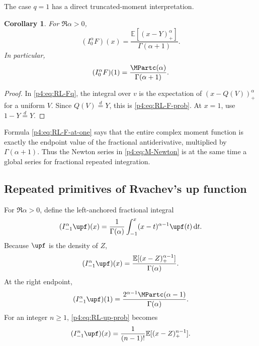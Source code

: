 \documentclass[11pt,oneside]{article}
\newtheorem{corollary}[theorem]{Corollary}
\theoremstyle{definition}
\theoremstyle{remark}
\newcommand{\F}{F}
\newcommand{\Q}{Q}
\newcommand{\E}{\mathbb E}
\newcommand{\dd}{\,\mathrm d}
\newcommand{\1}{\mathbf 1}
\begin{document}
The case \(q=1\) has a direct truncated-moment interpretation.

\begin{corollary}\label{p4:cor:RL-F-prob}
For \(\Re\alpha>0\),
\begin{equation}\label{p4:eq:RL-F-prob}
 (I_0^\alpha\F)(x)
 =\frac{\E[(x-Y)_+^\alpha]}{\Gamma(\alpha+1)}.
\end{equation}
In particular,
\begin{equation}\label{p4:eq:RL-F-at-one}
 (I_0^\alpha\F)(1)
 =\frac{\MPartc(\alpha)}{\Gamma(\alpha+1)}.
\end{equation}
\end{corollary}

\begin{proof}
In \cref{p4:eq:RL-Fq}, the integral over \(v\) is the expectation of
\((x-\Q(V))_+^\alpha\) for a uniform \(V\).  Since \(\Q(V)\overset d=Y\), this is
\cref{p4:eq:RL-F-prob}.  At \(x=1\), use \(1-Y\overset d=Y\).
\end{proof}

Formula \cref{p4:eq:RL-F-at-one} says that the entire complex moment function is exactly
the endpoint value of the fractional antiderivative, multiplied by
\(\Gamma(\alpha+1)\).  Thus the Newton series in \cref{p4:eq:M-Newton} is at the same
time a global series for fractional repeated integration.

\subsection{Repeated primitives of Rvachev's up function}

For \(\Re\alpha>0\), define the left-anchored fractional integral
\begin{equation}\label{p4:eq:RL-up-def}
 (I_{-1}^\alpha\upf)(x)
 =\frac1{\Gamma(\alpha)}\int_{-1}^x(x-t)^{\alpha-1}\upf(t)\dd t.
\end{equation}
Because \(\upf\) is the density of \(Z\),
\begin{equation}\label{p4:eq:RL-up-prob}
 (I_{-1}^\alpha\upf)(x)
 =\frac{\E[(x-Z)_+^{\alpha-1}]}{\Gamma(\alpha)}.
\end{equation}
At the right endpoint,
\begin{equation}\label{p4:eq:RL-up-at-one}
 (I_{-1}^\alpha\upf)(1)
 =\frac{2^{\alpha-1}\MPartc(\alpha-1)}{\Gamma(\alpha)}.
\end{equation}
For an integer \(n\ge1\), \cref{p4:eq:RL-up-prob} becomes
\begin{equation}\label{p4:eq:nth-up-primitive}
 (I_{-1}^n\upf)(x)
 =\frac1{(n-1)!}\E[(x-Z)_+^{n-1}].
\end{equation}
\end{document}
